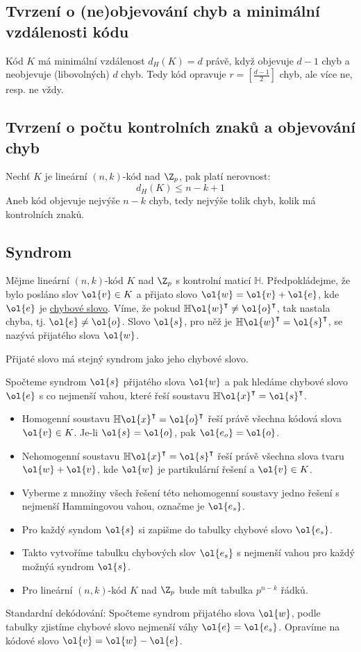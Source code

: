 \subsection{Tvrzení o (ne)objevování chyb a minimální vzdálenosti kódu}
Kód $K$ má minimální vzdálenost $d_H(K) = d$ právě, když objevuje $d-1$ chyb a neobjevuje (libovolných) $d$ chyb. Tedy kód opravuje $r = \left[\frac{d-1}{2}\right]$ chyb, ale více ne, resp. ne vždy.

\subsection{Tvrzení o počtu kontrolních znaků a objevování chyb}
Nechť $K$ je lineární $(n,k)$-kód nad $\Z_p$, pak platí nerovnost:
\begin{equation}
	d_H(K) \leq n-k+1	
\end{equation}
Aneb kód objevuje nejvýše $n-k$ chyb, tedy nejvýše tolik chyb, kolik má kontrolních znaků.

\subsection{Syndrom}\label{syndrom}
Mějme lineární $(n,k)$-kód $K$ nad $\Z_p$ s kontrolní maticí $\mathbb{H}$. Předpokládejme, že bylo posláno slov $\ol{v} \in K$ a přijato slovo $\ol{w} = \ol{v} + \ol{e}$, kde $\ol{e}$ je \hyperref[chybSlovo]{chybové slovo}. Víme, že pokud $\mathbb{H}\ol{w}^\intercal \not= \ol{o}^\intercal$, tak nastala chyba, tj. $\ol{e} \not= \ol{o}$. Slovo $\ol{s}$, pro něž je $\mathbb{H}\ol{w}^\intercal = \ol{s}^\intercal$, se nazývá  přijatého slova $\ol{w}$.

Přijaté slovo má stejný syndrom jako jeho chybové slovo.

Spočteme syndrom $\ol{s}$ přijatého slova $\ol{w}$ a pak hledáme chybové slovo $\ol{e}$ s co nejmenší vahou, které řeší soustavu $\mathbb{H}\ol{x}^\intercal = \ol{s}^\intercal$.
\vspace{-1em}
\begin{itemize}
	\item Homogenní soustavu $\mathbb{H}\ol{x}^\intercal = \ol{o}^\intercal$ řeší právě všechna kódová slova $\ol{v} \in K$. Je-li $\ol{s} = \ol{o}$, pak $\ol{e_o} = \ol{o}$.
	\item Nehomogenní soustavu $\mathbb{H}\ol{x}^\intercal = \ol{s}^\intercal$ řeší právě všechna slova tvaru $\ol{w} + \ol{v}$, kde $\ol{w}$ je partikulární řešení a $\ol{v} \in K$.
	\item Vyberme z množiny všech řešení této nehomogenní soustavy jedno řešení s nejmenší Hammingovou vahou, označme je $\ol{e_s}$.
	\item Pro každý syndom $\ol{s}$ si zapišme do tabulky chybové slovo $\ol{e_s}$.
	\item Takto vytvoříme tabulku chybových slov $\ol{e_s}$ s nejmenší vahou pro každý možnýá syndrom $\ol{s}$.
	\item Pro lineární $(n,k)$-kód $K$ nad $\Z_p$ bude mít tabulka $p^{n-k}$ řádků.
\end{itemize}
Standardní dekódování: Spočteme syndrom přijatého slova $\ol{w}$, podle tabulky zjistíme chybové slovo nejmenší váhy $\ol{e} = \ol{e_s}$. Opravíme na kódové slovo $\ol{v} = \ol{w} - \ol{e}$.


